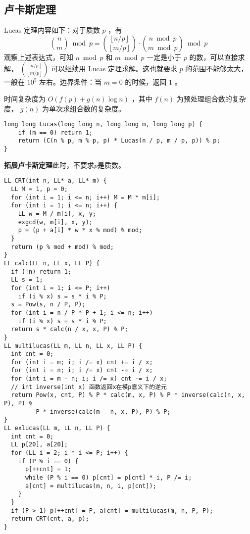 \subsection{卢卡斯定理}
Lucas 定理内容如下：对于质数 $p$ ，有
\begin{equation*}
  \binom{n}{m}\bmod p = \binom{\left\lfloor n/p \right\rfloor}{\left\lfloor m/p\right\rfloor}\cdot\binom{n\bmod p}{m\bmod p}\bmod p
\end{equation*}
观察上述表达式，可知 $n\bmod p$ 和 $m\bmod p$ 一定是小于 $p$ 的数，可以直接求解， $\displaystyle\binom{\left\lfloor n/p \right\rfloor}{\left\lfloor m/p\right\rfloor}$ 可以继续用 Lucas 定理求解。这也就要求 $p$ 的范围不能够太大，一般在 $10^5$ 左右。边界条件：当 $m=0$ 的时候，返回 $1$ 。\par
时间复杂度为 $O(f(p) + g(n)\log n)$ ，其中 $f(n)$ 为预处理组合数的复杂度， $g(n)$ 为单次求组合数的复杂度。
\begin{lstlisting}
long long Lucas(long long n, long long m, long long p) {
    if (m == 0) return 1;
    return (C(n % p, m % p, p) * Lucas(n / p, m / p, p)) % p;
}
\end{lstlisting}
\textbf{拓展卢卡斯定理}此时，不要求$p$是质数。
\begin{lstlisting}
LL CRT(int n, LL* a, LL* m) {
  LL M = 1, p = 0;
  for (int i = 1; i <= n; i++) M = M * m[i];
  for (int i = 1; i <= n; i++) {
    LL w = M / m[i], x, y;
    exgcd(w, m[i], x, y);
    p = (p + a[i] * w * x % mod) % mod;
  }
  return (p % mod + mod) % mod;
}
LL calc(LL n, LL x, LL P) {
  if (!n) return 1;
  LL s = 1;
  for (int i = 1; i <= P; i++)
    if (i % x) s = s * i % P;
  s = Pow(s, n / P, P);
  for (int i = n / P * P + 1; i <= n; i++)
    if (i % x) s = s * i % P;
  return s * calc(n / x, x, P) % P;
}
LL multilucas(LL m, LL n, LL x, LL P) {
  int cnt = 0;
  for (int i = m; i; i /= x) cnt += i / x;
  for (int i = n; i; i /= x) cnt -= i / x;
  for (int i = m - n; i; i /= x) cnt -= i / x;
  // int inverse(int x) 函数返回x在模p意义下的逆元
  return Pow(x, cnt, P) % P * calc(m, x, P) % P * inverse(calc(n, x, P), P) %
         P * inverse(calc(m - n, x, P), P) % P;
}
LL exlucas(LL m, LL n, LL P) {
  int cnt = 0;
  LL p[20], a[20];
  for (LL i = 2; i * i <= P; i++) {
    if (P % i == 0) {
      p[++cnt] = 1;
      while (P % i == 0) p[cnt] = p[cnt] * i, P /= i;
      a[cnt] = multilucas(m, n, i, p[cnt]);
    }
  }
  if (P > 1) p[++cnt] = P, a[cnt] = multilucas(m, n, P, P);
  return CRT(cnt, a, p);
}
\end{lstlisting}

